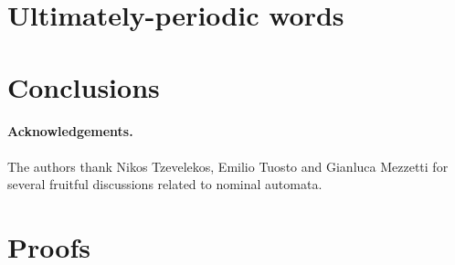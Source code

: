 \documentclass[orivec]{llncs}
\begin{document}
\section{Ultimately-periodic words}\label{sec:up-words}



\section{Conclusions}\label{sec:conclusions}



\paragraph{Acknowledgements.} The authors thank Nikos Tzevelekos, Emilio Tuosto and Gianluca Mezzetti for several fruitful discussions related to nominal automata.





\appendix
\section{Proofs}

\end{document}
